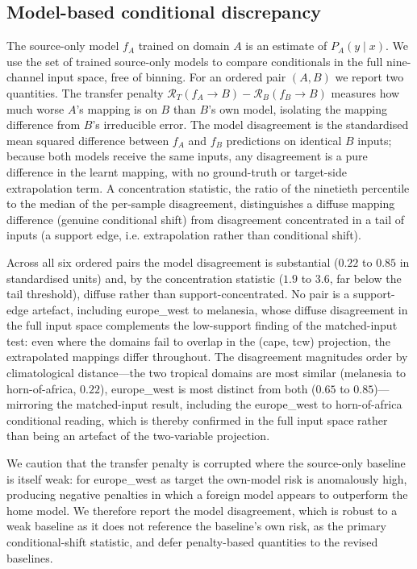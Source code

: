 \documentclass{article}
\begin{document}
\subsection{Model-based conditional discrepancy}
\label{sec:model_based}

The source-only model $f_A$ trained on domain $A$ is an estimate of
$P_A(y\mid x)$. We use the set of trained source-only models to compare
conditionals in the full nine-channel input space, free of binning. For
an ordered pair $(A,B)$ we report two quantities. The transfer penalty
$\mathcal{R}_T(f_A\!\to\!B) - \mathcal{R}_B(f_B\!\to\!B)$ measures how
much worse $A$'s mapping is on $B$ than $B$'s own model, isolating the
mapping difference from $B$'s irreducible error. The model disagreement
is the standardised mean squared difference between $f_A$ and $f_B$
predictions on identical $B$ inputs; because both models receive the
same inputs, any disagreement is a pure difference in the learnt
mapping, with no ground-truth or target-side extrapolation term. A
concentration statistic, the ratio of the ninetieth percentile to the
median of the per-sample disagreement, distinguishes a diffuse mapping
difference (genuine conditional shift) from disagreement concentrated
in a tail of inputs (a support edge, i.e. extrapolation rather than
conditional shift).

Across all six ordered pairs the model disagreement is substantial
($0.22$ to $0.85$ in standardised units) and, by the concentration
statistic ($1.9$ to $3.6$, far below the tail threshold), diffuse
rather than support-concentrated. No pair is a support-edge artefact,
including europe\_west to melanesia, whose diffuse disagreement in the
full input space complements the low-support finding of the
matched-input test: even where the domains fail to overlap in the
(cape, tcw) projection, the extrapolated mappings differ throughout.
The disagreement magnitudes order by climatological distance---the two
tropical domains are most similar (melanesia to horn-of-africa,
$0.22$), europe\_west is most distinct from both ($0.65$ to
$0.85$)---mirroring the matched-input result, including the
europe\_west to horn-of-africa conditional reading, which is thereby
confirmed in the full input space rather than being an artefact of the
two-variable projection.

We caution that the transfer penalty is corrupted where the source-only
baseline is itself weak: for europe\_west as target the own-model risk
is anomalously high, producing negative penalties in which a foreign
model appears to outperform the home model. We therefore report the
model disagreement, which is robust to a weak baseline as it does not
reference the baseline's own risk, as the primary conditional-shift
statistic, and defer penalty-based quantities to the revised baselines.
\end{document}
